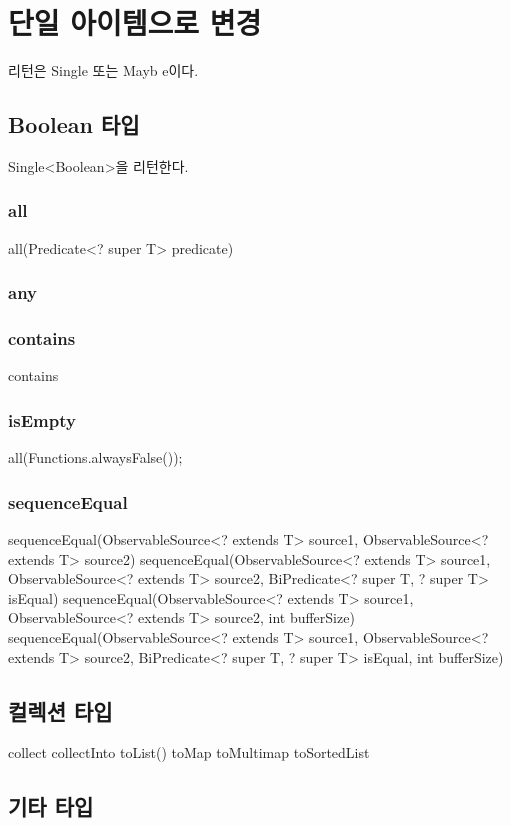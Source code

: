 \documentclass{book}
\begin{document}
{\section{단일 아이템으로 변경}
리턴은 Single 또는  Mayb e이다.

\subsection{Boolean 타입}       
Single<Boolean>을 리턴한다.           
\subsubsection{all}
all(Predicate<? super T> predicate)

\subsubsection{any}

\subsubsection{contains}
contains

\subsubsection{isEmpty}
all(Functions.alwaysFalse());

\subsubsection{sequenceEqual}

sequenceEqual(ObservableSource<? extends T> source1, ObservableSource<? extends T> source2)
sequenceEqual(ObservableSource<? extends T> source1, ObservableSource<? extends T> source2,
            BiPredicate<? super T, ? super T> isEqual)
            sequenceEqual(ObservableSource<? extends T> source1, ObservableSource<? extends T> source2,
            int bufferSize)
sequenceEqual(ObservableSource<? extends T> source1, ObservableSource<? extends T> source2,
            BiPredicate<? super T, ? super T> isEqual, int bufferSize)

\subsection{컬렉션 타입}
collect
collectInto
toList()
toMap
toMultimap
toSortedList

\subsection{기타 타입}
}
\end{document}
